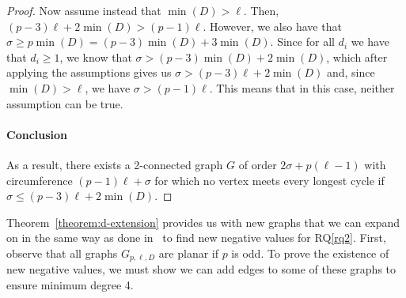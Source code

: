 \begin{proof}
Now assume instead that $\min(D) > \ell$. Then, $(p-3)\ell + 2\min(D) > (p-1)\ell$. However, we also have that $\sigma \ge p \min(D) = (p-3)\min(D) + 3\min(D)$. Since for all $d_i$ we have that $d_i\ge1$, we know that $\sigma > (p-3)\min(D) + 2\min(D)$, which after applying the assumptions gives us $\sigma > (p-3)\ell + 2\min(D)$ and, since $\min(D) > \ell$, we have $\sigma > (p-1)\ell$. This means that in this case, neither assumption can be true.

\paragraph{Conclusion}
As a result, there exists a 2-connected graph $G$ of order $2\sigma + p(\ell-1)$ with circumference $(p-1)\ell + \sigma$ for which no vertex meets every longest cycle if $\sigma \le (p-3)\ell + 2\min(D)$.

\end{proof}

Theorem~\ref{theorem:d-extension} provides us with new graphs that we can expand on in the same way as done in~\cite{article:zamfirescu} to find new negative values for RQ\ref{rq2}. First, observe that all graphs $G_{p,\ell,D}$ are planar if $p$ is odd. To prove the existence of new negative values, we must show we can add edges to some of these graphs to ensure minimum degree 4.

